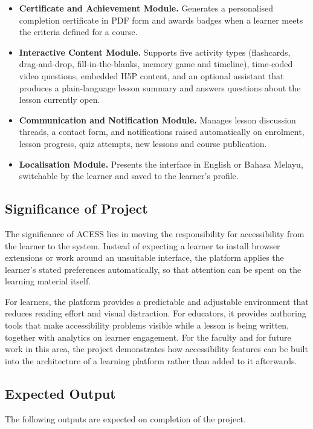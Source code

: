 \documentclass[12pt, oneside]{article} %
\begin{document}
\begin{itemize}
    \item \textbf{Certificate and Achievement Module.} Generates a personalised completion certificate in PDF form and awards badges when a learner meets the criteria defined for a course.
    \item \textbf{Interactive Content Module.} Supports five activity types (flashcards, drag-and-drop, fill-in-the-blanks, memory game and timeline), time-coded video questions, embedded H5P content, and an optional assistant that produces a plain-language lesson summary and answers questions about the lesson currently open.
    \item \textbf{Communication and Notification Module.} Manages lesson discussion threads, a contact form, and notifications raised automatically on enrolment, lesson progress, quiz attempts, new lessons and course publication.
    \item \textbf{Localisation Module.} Presents the interface in English or Bahasa Melayu, switchable by the learner and saved to the learner's profile.
\end{itemize}

\subsection{Significance of Project}

The significance of ACESS lies in moving the responsibility for accessibility from the learner to the system. Instead of expecting a learner to install browser extensions or work around an unsuitable interface, the platform applies the learner's stated preferences automatically, so that attention can be spent on the learning material itself.

For learners, the platform provides a predictable and adjustable environment that reduces reading effort and visual distraction. For educators, it provides authoring tools that make accessibility problems visible while a lesson is being written, together with analytics on learner engagement. For the faculty and for future work in this area, the project demonstrates how accessibility features can be built into the architecture of a learning platform rather than added to it afterwards.

\subsection{Expected Output}

The following outputs are expected on completion of the project.
\end{document}

